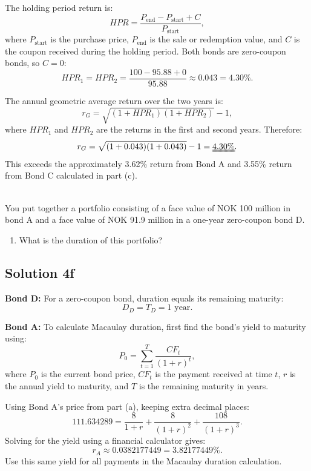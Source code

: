 \documentclass[12]{article}
\begin{document}
\par\noindent The holding period return is:
\[
HPR=\frac{P_{\mathrm{end}}-P_{\mathrm{start}}+C}{P_{\mathrm{start}}},
\]
where $P_{\mathrm{start}}$ is the purchase price, $P_{\mathrm{end}}$ is the sale or redemption value, and $C$ is the coupon received during the holding period.
Both bonds are zero-coupon bonds, so $C=0$:
\[
HPR_1=HPR_2=\frac{100-95.88+0}{95.88}\approx0.043=4.30\%.
\]

\par\noindent The annual geometric average return over the two years is:
\[
r_G=\sqrt{(1+HPR_1)(1+HPR_2)}-1,
\]
where $HPR_1$ and $HPR_2$ are the returns in the first and second years.
Therefore:
\[
r_G=\sqrt{(1+0.043)(1+0.043)}-1=\text{\uuline{4.30\%}}.
\]
\noindent This exceeds the approximately 3.62\% return from Bond A and 3.55\% return from Bond C calculated in part (c).




\noindent
\\
\color{black}
You put together a portfolio consisting of a face value of NOK 100 million in bond A and a face value of NOK 91.9 million in a one-year zero-coupon bond D.
\begin{enumerate}
    \item [f)] What is the duration of this portfolio?
\end{enumerate}

\color{blue}
\subsection*{Solution 4f}
\noindent\textbf{Bond D:}
For a zero-coupon bond, duration equals its remaining maturity:
\[
D_D=T_D=1\text{ year}.
\]

\par\noindent\textbf{Bond A:}
To calculate Macaulay duration, first find the bond's yield to maturity using:
\[
P_0=\sum_{t=1}^{T}\frac{CF_t}{(1+r)^t},
\]
where $P_0$ is the current bond price, $CF_t$ is the payment received at time $t$, $r$ is the annual yield to maturity, and $T$ is the remaining maturity in years.

\par\noindent Using Bond A's price from part (a), keeping extra decimal places:
\[
111.634289=\frac{8}{1+r}+\frac{8}{(1+r)^2}+\frac{108}{(1+r)^3}.
\]
Solving for the yield using a financial calculator gives:
\[
r_A\approx0.0382177449=3.82177449\%.
\]
Use this same yield for all payments in the Macaulay duration calculation.
\end{document}
